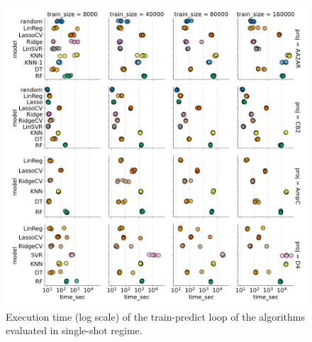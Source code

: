 \begin{figure}[ht]
\centering
\includegraphics[width=1.0\textwidth]{figures/Supp_Figure_1_execution_time.png}
\caption{Execution time (log scale) of the train-predict loop of the algorithms evaluated in single-shot regime.}
\label{fig:supp_fig_1_execution_time}
\end{figure}
